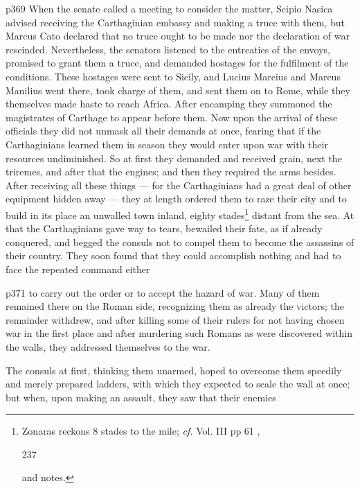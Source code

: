 p369
When the senate called a meeting to consider the matter, Scipio Nasica advised receiving the Carthaginian embassy and making a truce with them, but Marcus Cato declared that no truce ought to be made nor the declaration of war rescinded. Nevertheless, the senators listened to the entreaties of the envoys, promised to grant them a truce, and demanded hostages for the fulfilment of the conditions. These hostages were sent to Sicily, and Lucius Marcius and Marcus Manilius went there, took charge of them, and sent them on to Rome, while they themselves made haste to reach Africa. After encamping they summoned the magistrates of Carthage to appear before them. Now upon the arrival of these officials they did not unmask all their demands at once, fearing that if the Carthaginians learned them in season they would enter upon war with their resources undiminished. So at first they demanded and received grain, next the triremes, and after that the engines; and then they required the arms besides. After receiving all these things \texthebrew{—} for the Carthaginians had a great deal of other equipment hidden away \texthebrew{—} they at length ordered them to raze their city and to build in its place an unwalled town inland, eighty stades\texthebrew{⁠}\footnote{Zonaras reckons 8 stades to the mile; \emph{cf.} Vol. III pp 61 ,

237

and notes.

} distant from the sea. At that the Carthaginians gave way to tears, bewailed their fate, as if already conquered, and begged the consuls not to compel them to become the assassins of their country. They soon found that they could accomplish nothing and had to face the repeated command either

p371 to carry out the order or to accept the hazard of war. Many of them remained there on the Roman side, recognizing them as already the victors; the remainder withdrew, and after killing some of their rulers for not having chosen war in the first place and after murdering such Romans as were discovered within the walls, they addressed themselves to the war.

The consuls at first, thinking them unarmed, hoped to overcome them speedily and merely prepared ladders, with which they expected to scale the wall at once; but when, upon making an assault, they saw that their enemies

